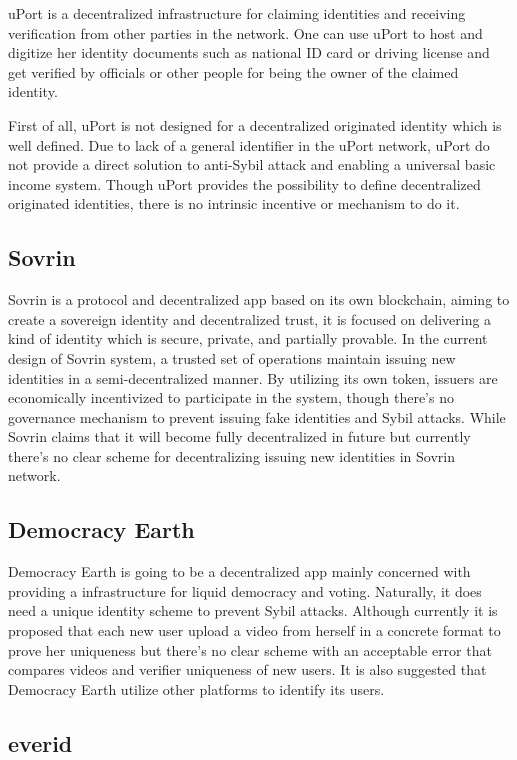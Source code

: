 \documentclass[conference]{IEEEtran}
\begin{document}
uPort is a decentralized infrastructure for claiming identities and receiving verification from other parties in the network. One can use uPort to host and digitize her identity documents such as national ID card or driving license and get verified by officials or other people for being the owner of the claimed identity.


 First of all, uPort is not designed for a decentralized originated identity which is well defined. Due to lack of a general identifier in the uPort network, uPort do not provide a direct solution to anti-Sybil attack and enabling a universal basic income system. Though uPort provides the possibility to define decentralized originated identities, there is no intrinsic incentive or mechanism to do it.

\subsection{Sovrin}

Sovrin is a protocol and decentralized app based on its own blockchain, aiming to create a sovereign identity and decentralized trust, it is focused on delivering a kind of identity which is secure, private, and partially provable. In the current design of Sovrin system, a trusted set of operations maintain issuing new identities in a semi-decentralized manner. By utilizing its own token, issuers are economically incentivized to participate in the system, though there’s no governance mechanism to prevent issuing fake identities and Sybil attacks. While Sovrin claims that it will become fully decentralized in future but currently there’s no clear scheme for decentralizing issuing new identities in Sovrin network. 

\subsection{Democracy Earth}
Democracy Earth is going to be a decentralized app mainly concerned with providing a infrastructure for liquid democracy and voting. Naturally, it does need a unique identity scheme to prevent Sybil attacks. Although currently it is proposed that each new user upload a video from herself in a concrete format to prove her uniqueness but there’s no clear scheme with an acceptable error that compares videos and verifier uniqueness of new users. It is also suggested that Democracy Earth utilize other platforms to identify its users.
\subsection{everid}
\end{document}
